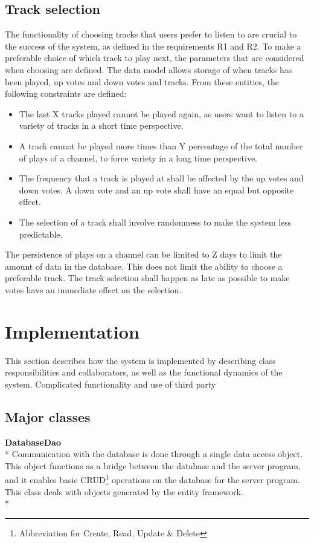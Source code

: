 \documentclass[a4paper,11pt,report]{article}
\begin{document}
\subsection{Track selection}
The functionality of choosing tracks that users prefer to listen to are crucial to the success of the system, as defined in the requirements R1 and R2. To make a preferable choice of which track to play next, the parameters that are considered when choosing are defined. The data model allows storage of when tracks has been played, up votes and down votes and tracks. From these entities, the following constraints are defined:
\begin{itemize}
\item The last X tracks played cannot be played again, as users want to listen to a variety of tracks in a short time perspective.
\item A track cannot be played more times than Y percentage of the total number of plays of a channel, to force variety in a long time perspective.
\item The frequency that a track is played at shall be affected by the up votes and down votes. A down vote and an up vote shall have an equal but opposite effect.
\item The selection of a track shall involve randomness to make the system less predictable.
\end{itemize}
The persistence of plays on a channel can be limited to Z days to limit the amount of data in the database. This does not limit the ability to choose a preferable track. The track selection shall happen as late as possible to make votes have an immediate effect on the selection. 

\section{Implementation}
This section describes how the system is implemented by describing class responsibilities and collaborators, as well as the functional dynamics of the system. Complicated functionality and use of third party 

\subsection{Major classes}
\textbf{DatabaseDao} \\*
Communication with the database is done through a single data access object. This object functions as a bridge between the database and the server program, and it enables basic CRUD\footnote{Abbreviation for Create, Read, Update \& Delete} operations on the database for the server program. This class deals with objects generated by the entity framework. \\*
\end{document}
